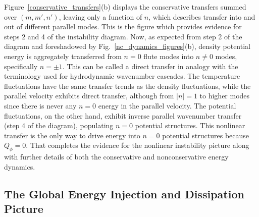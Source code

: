 \documentclass[showpacs,preprintnumbers,amsmath,amssymb,superscriptaddress]{revtex4}
\begin{document}
Figure~\ref{conservative_transfers}(b) displays the conservative transfers summed over $(m,m',n')$, leaving only a function of $n$, which describes transfer into and out
of different parallel modes. This is the figure which provides evidence for steps 2 and 4 of the instability diagram.
Now, as expected from step 2 of the diagram and foreshadowed by Fig.~\ref{nc_dynamics_figures}(b), 
density potential energy is aggregately transferred from $n=0$ flute modes into $n \ne 0$ modes, specifically $n = \pm 1$. This can be called a direct
transfer in analogy with the terminology used for hydrodynamic wavenumber cascades. The temperature fluctuations have the same transfer trends 
as the density fluctuations, while the parallel velocity exhibits direct transfer, although from $|n|=1$ to higher modes since there is never any $n=0$ energy in the parallel velocity.
The potential fluctuations, on the other hand, exhibit inverse parallel wavenumber transfer (step 4 of the diagram),
populating $n=0$ potential structures. This nonlinear transfer is the only way to drive energy into
$n=0$ potential structures because $Q_\phi=0$. That completes the evidence for the nonlinear instability picture along with further details of both the conservative and nonconservative energy dynamics.


\subsection{The Global Energy Injection and Dissipation Picture}
\end{document}
